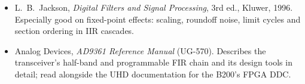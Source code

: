 \begin{itemize}
{Computers}, vol.~EC-8, no.~3, 1959; and R.~Andraka, ``A survey of CORDIC algorithms for FPGA based
computers,'' \emph{Proc. ACM/SIGDA FPGA '98}, 1998, the standard hardware-oriented introduction.
\item L.~B.~Jackson, \emph{Digital Filters and Signal Processing}, 3rd ed., Kluwer, 1996. Especially good
on fixed-point effects: scaling, roundoff noise, limit cycles and section ordering in IIR cascades.
\item Analog Devices, \emph{AD9361 Reference Manual} (UG-570). Describes the transceiver's half-band
and programmable FIR chain and its design tools in detail; read alongside the UHD documentation for
the B200's FPGA DDC.
\end{itemize}

